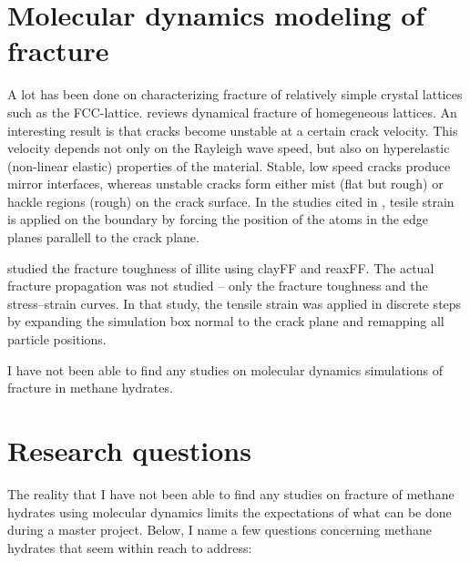 \section{Molecular dynamics modeling of fracture}
A lot has been done on characterizing fracture of relatively simple crystal lattices such as the FCC-lattice. \citet[ch. 6]{doi:10.1142/9789812773326_0001} reviews dynamical fracture of homegeneous lattices. An interesting result is that cracks become unstable at a certain crack velocity. This velocity depends not only on the Rayleigh wave speed, but also on hyperelastic (non-linear elastic) properties of the material. Stable, low speed cracks produce mirror interfaces, whereas unstable cracks form either mist (flat but rough) or hackle regions (rough) on the crack surface. In the studies cited in \citet[ch. 6]{doi:10.1142/9789812773326_0001}, tesile strain is applied on the boundary by forcing the position of the atoms in the edge planes parallell to the crack plane. 

\citet{Hantal2014} studied the fracture toughness of illite using clayFF and reaxFF. The actual fracture propagation was not studied -- only the fracture toughness and the stress--strain curves. In that study, the tensile strain was applied in discrete steps by expanding the simulation box normal to the crack plane and remapping all particle positions.

I have not been able to find any studies on molecular dynamics simulations of fracture in methane hydrates.


\section{Research questions}
The reality that I have not been able to find any studies on fracture of methane hydrates using molecular dynamics limits the expectations of what can be done during a master project. Below, I name a few questions concerning methane hydrates that seem within reach to address:

